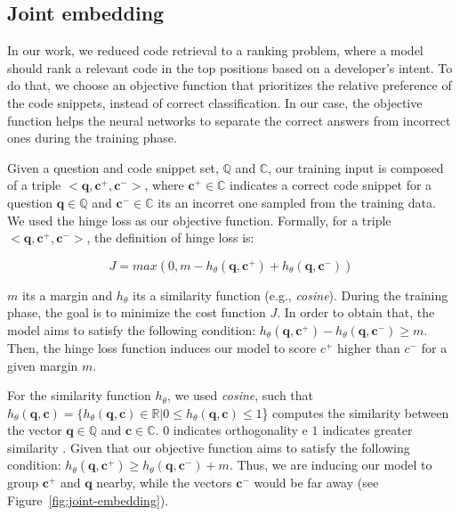\documentclass[sigconf]{acmart}
\begin{document}
\subsection{Joint embedding}
\label{sec:joint-embedding}

In our work, we reduced code retrieval to a ranking problem, where a model should rank a relevant code in the top positions based on a developer's intent. To do that, we choose an objective function that prioritizes the relative preference of the code snippets, instead of correct classification. In our case, the objective function helps the neural networks to separate the correct answers from incorrect ones during the training phase.


Given a question and code snippet set, $\mathbb{Q}$ and $\mathbb{C}$, our training input is composed of a triple $<\bm{q}, \bm{c^{+}}, \bm{c^{-}}>$, where $\bm{c^{+}} \in \mathbb{C}$ indicates a correct code snippet for a question $\bm{q} \in \mathbb{Q}$ and $\bm{c^{-}} \in \mathbb{C}$ its an incorret one sampled from the training data. We used the hinge loss as our objective function. Formally, for a triple $<\bm{q}, \bm{c^{+}}, \bm{c^{-}}>$, the definition of hinge loss is:

\begin{equation}
J = max(0, m - h_{\theta}(\bm{q}, \bm{c^{+}}) + h_{\theta}(\bm{q}, \bm{c^{-}}))
\end{equation}

$m$ its a margin and $h_{\theta}$ its a similarity function (e.g., \textit{cosine}). During the training phase, the goal is to minimize the cost function $J$. In order to obtain that, the model aims to satisfy the following condition: $h_{\theta}(\bm{q}, \bm{c^{+}}) - h_{\theta}(\bm{q}, \bm{c^{-}}) \geq m$. Then, the hinge loss function induces our model to score $c^{+}$ higher than $c^{-}$ for a given margin $m$. 

For the similarity function $h_{\theta}$, we used \emph{cosine}, such that $h_{\theta}(\bm{q}, \bm{c}) = \{h_{\theta}(\bm{q}, \bm{c}) \in \mathbb{R} | 0 \leq h_{\theta}(\bm{q}, \bm{c}) \leq 1$\} computes the similarity between the vector $\bm{q} \in \mathbb{Q}$ and $\bm{c} \in \mathbb{C}$. $0$ indicates orthogonality e $1$ indicates greater similarity \cite{keras-cosine-similarity-2019}.  Given that our objective function aims to satisfy the following condition: $h_{\theta}(\bm{q}, \bm{c^{+}}) \geq h_{\theta}(\bm{q}, \bm{c^{-}}) + m$. Thus, we are inducing our model to group $\bm{c^{+}}$ and $\bm{q}$ nearby, while the vectors $\bm{c^{-}}$ would be far away (see Figure~\ref{fig:joint-embedding}). 
\end{document}

